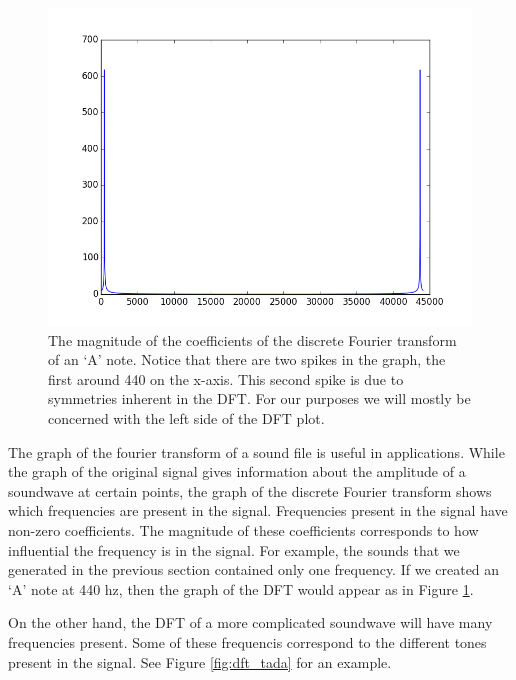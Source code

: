 \begin{center}
\begin{figure}
\includegraphics[scale=0.7]{a_dft}
\caption{The magnitude of the coefficients of the discrete Fourier transform of an `A' note.  Notice that there are two spikes in the graph, the first around 440 on the x-axis.  This second spike is due to symmetries inherent in the DFT.  For our purposes we will mostly be concerned with the left side of the DFT plot.}
\label{fig:dft_a}
\end{figure}
\end{center}

The graph of the fourier transform of a sound file is useful in applications.
While the graph of the original signal gives information about the amplitude of a soundwave at certain points, the graph of the discrete Fourier transform  shows which frequencies are present in the signal.
Frequencies present in the signal have non-zero coefficients.
The magnitude of these coefficients corresponds to how influential the frequency is in the signal.
For example, the sounds that we generated in the previous section contained only one frequency.
If we created an `A' note at 440 hz, then the graph of the DFT would appear as in Figure \ref{fig:dft_a}.

On the other hand, the DFT of a more complicated soundwave will have many frequencies present.
Some of these frequencis correspond to the different tones present in the signal.
See Figure \ref{fig:dft_tada} for an example.

